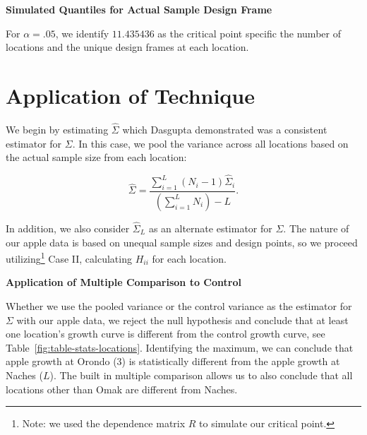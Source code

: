\documentclass[useAMS]{cJAS2e}
\begin{document}
\begin{table}[h!]
	\begin{center}
		
		 \scalebox{0.70}{  }
		
			
		\caption{\textbf{Simulated Quantiles for Actual Sample Design Frame}}
		\label{fig:quantiles-simulation-100000}
	\end{center}
\end{table}

For $\alpha = .05$, we identify  $11.435436$ as the critical point specific the number of locations and the unique design frames at each location.

\section{Application of Technique}\label{sec:application}

We begin by estimating $\hat{\Sigma}$ which Dasgupta \citet{Dasgupta:1996} demonstrated was a consistent estimator for $\Sigma$.  In this case, we pool the variance across all locations based on the actual sample size from each location:

\begin{equation}\label{eqn:pooled-variance}
\hat{\Sigma} = \frac{ \sum_{i=1}^{L} (N_i - 1) \hat{\Sigma}_i } {(\sum_{i=1}^{L} N_i) - L }.
\end{equation}

\noindent In addition, we also consider $\hat{\Sigma}_L$ as an alternate estimator for $\Sigma$.  The nature of our apple data is based on unequal sample sizes and design points, so we proceed utilizing\footnote{Note:  we used the dependence matrix $R$ to simulate our critical point.} Case II, calculating $H_{ii}$ for each location.

\begin{table}[h!]
	\begin{center}
		
		\scalebox{0.90}{  }
		
			
		\caption{\textbf{Application of Multiple Comparison to Control}}
		\label{fig:table-stats-locations}
	\end{center}
\end{table}

\noindent Whether we use the pooled variance or the control variance as the estimator for $\Sigma$ with our apple data,  we reject the null hypothesis and conclude that at least one location's growth curve is different from the control growth curve, see Table~\ref{fig:table-stats-locations}.  Identifying the maximum, we can conclude that apple growth at Orondo (3) is statistically different from the apple growth at Naches ($L$).  The built in multiple comparison allows us to also conclude that all locations other than Omak are different from Naches.
\end{document}
